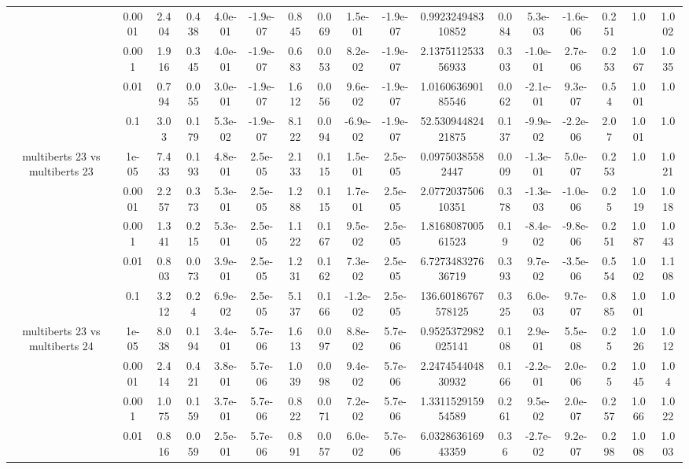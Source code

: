 \begin{tabular}{|c|c|c|c|c|c|c|c|c|c|c|c|c|c|c|c|c|}
 & 0.0001 & 2.404 & 0.438 & 4.0e-01 & -1.9e-07 & 0.845 & 0.069 & 1.5e-01 & -1.9e-07 & 0.992324948310852 & 0.084 & 5.3e-03 & -1.6e-06 & 0.251 & 1.0 & 1.002 \\
 & 0.001 & 1.916 & 0.345 & 4.0e-01 & -1.9e-07 & 0.683 & 0.053 & 8.2e-02 & -1.9e-07 & 2.137511253356933 & 0.303 & -1.0e-01 & 2.7e-06 & 0.253 & 1.067 & 1.035 \\
 & 0.01 & 0.794 & 0.055 & 3.0e-01 & -1.9e-07 & 1.612 & 0.056 & 9.6e-02 & -1.9e-07 & 1.016063690185546 & 0.062 & -2.1e-01 & 9.3e-07 & 0.54 & 1.001 & 1.0 \\
 & 0.1 & 3.03 & 0.179 & 5.3e-02 & -1.9e-07 & 8.122 & 0.094 & -6.9e-02 & -1.9e-07 & 52.53094482421875 & 0.137 & -9.9e-02 & -2.2e-06 & 2.07 & 1.001 & 1.0 \\
\hline
\multirow{5}{*}{multiberts 23 vs multiberts 23} & 1e-05 & 7.433 & 0.193 & 4.8e-01 & 2.5e-05 & 2.133 & 0.115 & 1.5e-01 & 2.5e-05 & 0.09750385582447 & 0.009 & -1.3e-01 & 5.0e-07 & 0.253 & 1.0 & 1.021 \\
 & 0.0001 & 2.257 & 0.373 & 5.3e-01 & 2.5e-05 & 1.288 & 0.115 & 1.7e-01 & 2.5e-05 & 2.077203750610351 & 0.378 & -1.3e-03 & -1.0e-06 & 0.25 & 1.019 & 1.018 \\
 & 0.001 & 1.341 & 0.215 & 5.3e-01 & 2.5e-05 & 1.122 & 0.167 & 9.5e-02 & 2.5e-05 & 1.816808700561523 & 0.19 & -8.4e-02 & -9.8e-06 & 0.251 & 1.087 & 1.043 \\
 & 0.01 & 0.803 & 0.073 & 3.9e-01 & 2.5e-05 & 1.231 & 0.162 & 7.3e-02 & 2.5e-05 & 6.727348327636719 & 0.393 & 9.7e-02 & -3.5e-06 & 0.554 & 1.002 & 1.108 \\
 & 0.1 & 3.212 & 0.24 & 6.9e-02 & 2.5e-05 & 5.137 & 0.166 & -1.2e-02 & 2.5e-05 & 136.60186767578125 & 0.325 & 6.0e-03 & 9.7e-07 & 0.885 & 1.001 & 1.0 \\
\hline
\multirow{5}{*}{multiberts 23 vs multiberts 24} & 1e-05 & 8.038 & 0.194 & 3.4e-01 & 5.7e-06 & 1.613 & 0.097 & 8.8e-02 & 5.7e-06 & 0.9525372982025141 & 0.108 & 2.9e-01 & 5.5e-08 & 0.25 & 1.026 & 1.012 \\
 & 0.0001 & 2.414 & 0.421 & 3.8e-01 & 5.7e-06 & 1.039 & 0.098 & 9.4e-02 & 5.7e-06 & 2.247454404830932 & 0.166 & -2.2e-01 & 2.0e-06 & 0.25 & 1.045 & 1.04 \\
 & 0.001 & 1.075 & 0.159 & 3.7e-01 & 5.7e-06 & 0.822 & 0.071 & 7.2e-02 & 5.7e-06 & 1.331152915954589 & 0.261 & 9.5e-02 & 2.0e-07 & 0.257 & 1.066 & 1.022 \\
 & 0.01 & 0.816 & 0.059 & 2.5e-01 & 5.7e-06 & 0.891 & 0.057 & 6.0e-02 & 5.7e-06 & 6.032863616943359 & 0.36 & -2.7e-02 & 9.2e-07 & 0.298 & 1.008 & 1.003 \\

\end{tabular}
